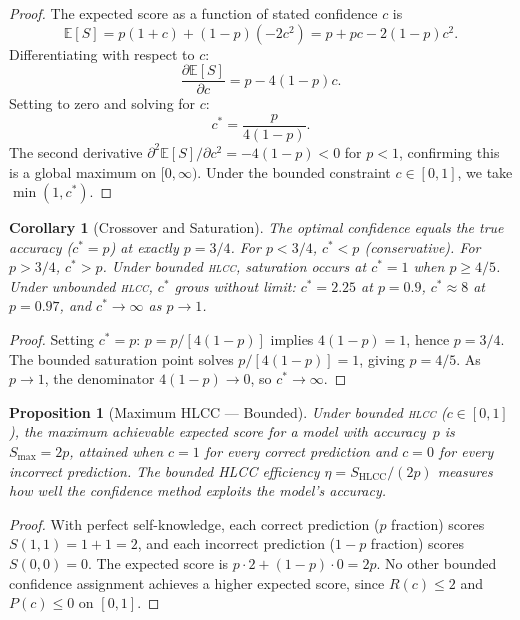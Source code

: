 \documentclass[11pt,a4paper]{article}
\newtheorem{proposition}{Proposition}
\newtheorem{corollary}{Corollary}
\newcommand{\hlcc}{\textsc{hlcc}}
\newcommand{\E}{\mathbb{E}}
\newcommand{\cstar}{c^{*}}
\begin{document}
\begin{proof}
  The expected score as a function of stated confidence $c$ is
  \begin{equation}
    \E[S] = p(1 + c) + (1-p)(-2c^{2}) = p + pc - 2(1-p)c^{2}.
  \end{equation}
  Differentiating with respect to $c$:
  \begin{equation}
    \frac{\partial \E[S]}{\partial c} = p - 4(1-p)c.
  \end{equation}
  Setting to zero and solving for $c$:
  \begin{equation}
    \cstar = \frac{p}{4(1-p)}.
  \end{equation}
  The second derivative $\partial^{2}\E[S]/\partial c^{2} = -4(1-p) < 0$
  for $p < 1$, confirming this is a global maximum on $[0,\infty)$.
  Under the bounded constraint $c \in [0,1]$, we take
  $\min(1, \cstar)$.
\end{proof}

\begin{corollary}[Crossover and Saturation]
\label{cor:crossover}
  The optimal confidence equals the true accuracy ($\cstar = p$)
  at exactly $p = 3/4$.  For $p < 3/4$, $\cstar < p$ (conservative).
  For $p > 3/4$, $\cstar > p$.  Under bounded \hlcc{}, saturation
  occurs at $\cstar = 1$ when $p \geq 4/5$.  Under unbounded \hlcc{},
  $\cstar$ grows without limit: $\cstar = 2.25$ at $p = 0.9$,
  $\cstar \approx 8$ at $p = 0.97$, and $\cstar \to \infty$ as
  $p \to 1$.
\end{corollary}

\begin{proof}
  Setting $\cstar = p$: $p = p/[4(1-p)]$ implies $4(1-p) = 1$, hence
  $p = 3/4$.  The bounded saturation point solves $p/[4(1-p)] = 1$,
  giving $p = 4/5$.  As $p \to 1$, the denominator $4(1-p) \to 0$,
  so $\cstar \to \infty$.
\end{proof}

\begin{proposition}[Maximum HLCC --- Bounded]
\label{prop:max-hlcc}
  Under bounded \hlcc{} ($c \in [0,1]$), the maximum achievable
  expected score for a model with accuracy~$p$ is $S_{\max} = 2p$,
  attained when $c = 1$ for every correct prediction and $c = 0$ for
  every incorrect prediction.  The \emph{bounded HLCC efficiency}
  $\eta = S_{\text{HLCC}} / (2p)$ measures how well the confidence
  method exploits the model's accuracy.
\end{proposition}

\begin{proof}
  With perfect self-knowledge, each correct prediction ($p$ fraction)
  scores $S(1, 1) = 1 + 1 = 2$, and each incorrect prediction
  ($1 - p$ fraction) scores $S(0, 0) = 0$.  The expected score is
  $p \cdot 2 + (1-p) \cdot 0 = 2p$.  No other bounded confidence
  assignment achieves a higher expected score, since
  $R(c) \leq 2$ and $P(c) \leq 0$ on $[0,1]$.
\end{proof}
\end{document}
